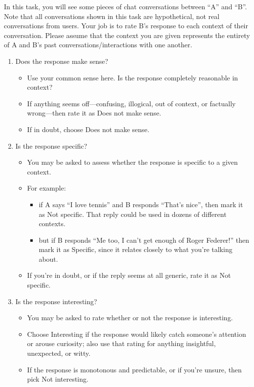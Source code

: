 \documentclass{article}
\begin{document}
In this task, you will see some pieces of chat conversations between ``A'' and ``B''. Note that all conversations shown in this task are hypothetical, not real conversations from users. Your job is to rate B's response to each context of their conversation. Please assume that the context you are given represents the entirety of A and B's past conversations/interactions with one another.

\begin{enumerate}

\item Does the response make sense?
\begin{itemize}
\item Use your common sense here. Is the response completely reasonable in context?
\item If anything seems off—confusing, illogical, out of context, or factually wrong—then rate it as Does not make sense.
\item If in doubt, choose Does not make sense.
\end{itemize}

\item Is the response specific?
\begin{itemize}
\item You may be asked to assess whether the response is specific to a given context.
\item For example:
\begin{itemize}
    \item if A says ``I love tennis'' and B responds ``That's nice'', then mark it as Not specific. That reply could be used in dozens of different contexts.
    \item but if B responds ``Me too, I can't get enough of Roger Federer!'' then mark it as Specific, since it relates closely to what you're talking about.
\end{itemize} 
\item If you're in doubt, or if the reply seems at all generic, rate it as Not specific.
\end{itemize}

\item Is the response interesting?
\begin{itemize}
\item You may be asked to rate whether or not the response is interesting.

\item Choose Interesting if the response would likely catch someone's attention or arouse curiosity; also use that rating for anything insightful, unexpected, or witty.
\item If the response is monotonous and predictable, or if you're unsure, then pick Not interesting.
\end{itemize}
\end{enumerate}
\end{document}
